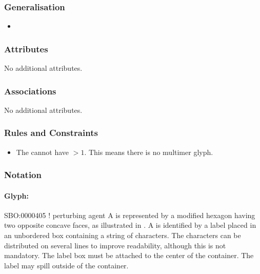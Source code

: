 \subsubsection{Generalisation}

\begin{itemize}
\item {}
\end{itemize}

\subsubsection{Attributes}

No additional attributes.

\subsubsection{Associations}

No additional attributes.

\subsubsection{Rules and Constraints}

\begin{itemize}
\item The  cannot have  $>
  1$. This means there is no multimer glyph.
\end{itemize}

\subsubsection{Notation}

\paragraph{Glyph: }

\begin{glyphDescription}
\glyphSboTerm SBO:0000405 ! perturbing agent
\glyphContainer A  is represented by a modified hexagon
having two opposite concave faces, as illustrated in .
\glyphLabel A  is identified by a label placed in an
unbordered box containing a string of characters.  The characters can be
distributed on several lines to improve readability, although this is not
mandatory.  The label box must be attached to the center of the
 container.  The label may spill outside of the container.
\end{glyphDescription}

